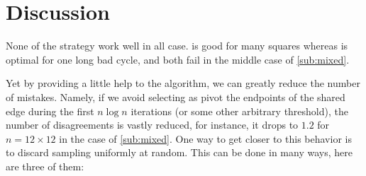 \section{Discussion}

None of the strategy work well in all case. \pot{} is good for many squares
whereas \pat{} is optimal for one long bad cycle, and both fail in the middle
case of \autoref{sub:mixed}.

Yet by providing a little help to the algorithm, we can greatly reduce the
number of mistakes. Namely, if we avoid selecting as pivot the endpoints of
the shared edge during the first $n\log n$ iterations (or some other arbitrary
threshold), the number of disagreements is vastly reduced, for instance, it
drops to $1.2$ for $n=12\times 12$ in the case of \autoref{sub:mixed}.  One
way to get closer to this behavior is to discard sampling uniformly at random.
This can be done in many ways, here are three of them:

